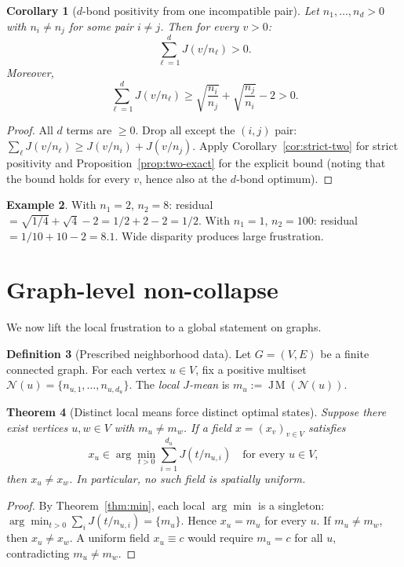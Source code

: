 \documentclass[11pt]{amsart}
\newtheorem{theorem}{Theorem}[section]
\newtheorem{corollary}[theorem]{Corollary}
\theoremstyle{definition}
\newtheorem{definition}[theorem]{Definition}
\newtheorem{example}[theorem]{Example}
\theoremstyle{remark}
\DeclareMathOperator{\JM}{J\!M}
\begin{document}
\begin{corollary}[$d$-bond positivity from one incompatible pair]
\label{cor:d-bond}
Let $n_1,\dots,n_d>0$ with $n_i\neq n_j$ for some pair $i\neq j$.
Then for every $v>0$:
\[
\sum_{\ell=1}^d J(v/n_\ell)>0.
\]
Moreover,
\[
\sum_{\ell=1}^d J(v/n_\ell)
\ge\sqrt{\frac{n_i}{n_j}}+\sqrt{\frac{n_j}{n_i}}-2>0.
\]
\end{corollary}
\begin{proof}
All $d$ terms are $\ge0$.  Drop all except the $(i,j)$ pair:
$\sum_\ell J(v/n_\ell)\ge J(v/n_i)+J(v/n_j)$.
Apply Corollary~\ref{cor:strict-two} for strict positivity and
Proposition~\ref{prop:two-exact} for the explicit bound
(noting that the bound holds for every $v$, hence also at the $d$-bond
optimum).
\end{proof}

\begin{example}
With $n_1=2$, $n_2=8$: residual $=\sqrt{1/4}+\sqrt{4}-2=1/2+2-2=1/2$.
With $n_1=1$, $n_2=100$: residual $=1/10+10-2=8.1$.
Wide disparity produces large frustration.
\end{example}

\section{Graph-level non-collapse}\label{sec:graph}

We now lift the local frustration to a global statement on graphs.

\begin{definition}[Prescribed neighborhood data]\label{def:prescribed}
Let $G=(V,E)$ be a finite connected graph.
For each vertex $u\in V$, fix a positive multiset
$\mathcal N(u)=\{n_{u,1},\dots,n_{u,d_u}\}$.
The \emph{local $J$-mean} is $m_u:=\JM(\mathcal N(u))$.
\end{definition}

\begin{theorem}[Distinct local means force distinct optimal states]
\label{thm:distinct}
Suppose there exist vertices $u,w\in V$ with $m_u\neq m_w$.
If a field $x=(x_v)_{v\in V}$ satisfies
\[
x_u\in\arg\min_{t>0}\sum_{i=1}^{d_u}J(t/n_{u,i})
\quad\text{for every }u\in V,
\]
then $x_u\neq x_w$.  In particular, no such field is spatially uniform.
\end{theorem}
\begin{proof}
By Theorem~\ref{thm:min}, each local $\arg\min$ is a singleton:
$\arg\min_{t>0}\sum_i J(t/n_{u,i})=\{m_u\}$.
Hence $x_u=m_u$ for every $u$.  If $m_u\neq m_w$, then $x_u\neq x_w$.
A uniform field $x_u\equiv c$ would require $m_u=c$ for all $u$,
contradicting $m_u\neq m_w$.
\end{proof}
\end{document}
